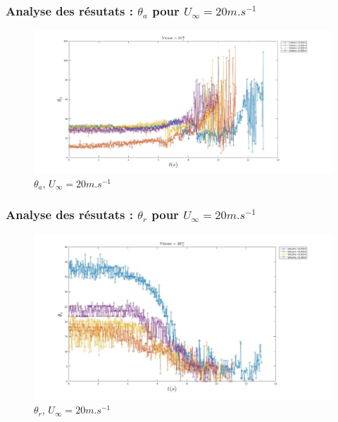 \documentclass{beamer}
\begin{document}
\begin{frame}
\frametitle{Analyse des résutats : $\theta_{a}$ pour $U_{\infty}=20m.s^{-1}$}
\begin{figure}[!ht]

	\includegraphics[width = \linewidth]{./image/v=20oa_2.jpg}
	\caption{$\theta_{a}$, $U_{\infty}=20m.s^{-1}$}
		\label{fig:v=20oa_2}
\end{figure}
\end{frame}

\begin{frame}
\frametitle{Analyse des résutats : $\theta_{r}$ pour $U_{\infty}=20m.s^{-1}$}
\begin{figure}[!ht]
        \centering
	\includegraphics[width = \linewidth]{./image/v=20or_2.jpg}
	\caption{$\theta_{r}$, $U_{\infty}=20m.s^{-1}$}
		\label{fig:v=20or_2}
\end{figure}
\end{frame}
\end{document}
